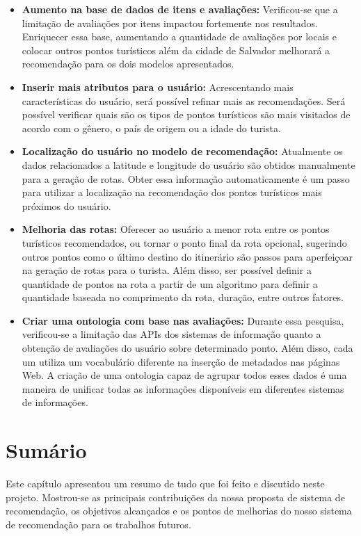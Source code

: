 \begin{itemize}
    \item \textbf{Aumento na base de dados de itens e avaliações:} Verificou-se que a limitação de avaliações por itens impactou fortemente nos resultados. Enriquecer essa base, aumentando a quantidade de avaliações por locais e colocar outros pontos turísticos além da cidade de Salvador melhorará a recomendação para os dois modelos apresentados.
    
    \item \textbf{Inserir mais atributos para o usuário:} Acrescentando mais características do usuário, será possível refinar mais as recomendações. Será possível verificar quais são os tipos de pontos turísticos são mais visitados de acordo com o gênero, o país de origem ou a idade do turista.
    
    \item \textbf{Localização do usuário no modelo de recomendação:} Atualmente os dados relacionados a latitude e longitude do usuário são obtidos manualmente para a geração de rotas. Obter essa informação automaticamente é um passo para utilizar a localização na recomendação dos pontos turísticos mais próximos do usuário.
    
    \item \textbf{Melhoria das rotas:} Oferecer ao usuário a menor rota entre os pontos turísticos recomendados, ou tornar o ponto final da rota opcional, sugerindo outros pontos como o último destino do itinerário são passos para aperfeiçoar na geração de rotas para o turista. Além disso, ser possível definir a quantidade de pontos na rota a partir de um algoritmo para definir a quantidade baseada no comprimento da rota, duração, entre outros fatores.
    
    \item \textbf{Criar uma ontologia com base nas avaliações:} Durante essa pesquisa, verificou-se a limitação das APIs dos sistemas de informação quanto a obtenção de avaliações do usuário sobre determinado ponto. Além disso, cada um utiliza um vocabulário diferente na inserção de metadados nas páginas Web. A criação de uma ontologia capaz de agrupar todos esses dados é uma maneira de unificar todas as informações disponíveis em diferentes sistemas de informações.
\end{itemize}

\section{Sumário}

Este capítulo apresentou um resumo de tudo que foi feito e discutido neste projeto. Mostrou-se as principais contribuições da nossa proposta de sistema de recomendação, os objetivos alcançados e os pontos de melhorias do nosso sistema de recomendação para os trabalhos futuros.